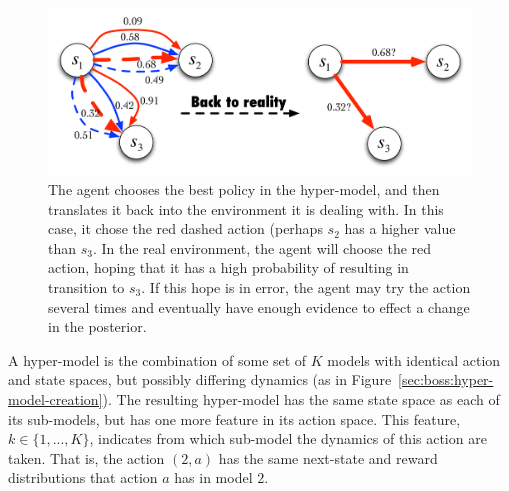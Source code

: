 \begin{figure}[t]
\begin{center}
\includegraphics[width=0.75\linewidth]{figures/hyper-to-real}
\caption{The agent chooses the best policy in the hyper-model, and then translates it back into the environment it is dealing with. In this case, it chose the red dashed action (perhaps $s_2$ has a higher value than $s_3$. In the real environment, the agent will choose the red action, hoping that it has a high probability of resulting in transition to $s_3$. If this hope is in error, the agent may try the action several times and eventually have enough evidence to effect a change in the posterior.}
\label{sec:boss:hyper-to-real}
\end{center}
\end{figure}

A hyper-model is the combination of some set of $K$ models with identical action and state spaces, but possibly differing dynamics (as in Figure~\ref{sec:boss:hyper-model-creation}). The resulting hyper-model  has the same state space as each of its sub-models, but has one more feature in its action space. This feature, $k\in\{1,...,K\}$, indicates from which sub-model the dynamics of this action are taken. That is, the action $(2, a)$ has the same next-state and reward distributions that action $a$ has in model $2$.


